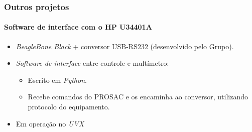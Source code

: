 \begin{frame}
\frametitle{Outros projetos}
\framesubtitle{Software de interface com o HP U34401A}

\begin{itemize}
  \item \textit{BeagleBone Black} + conversor USB-RS232 (desenvolvido pelo
  Grupo).
  \vspace{12pt}
  \item \textit{Software de interface} entre controle e multímetro:
  	\begin{itemize}
	\item Escrito em \textit{Python}.
	\item Recebe comandos do PROSAC e os encaminha ao conversor, utilizando
	protocolo do equipamento.
	\end{itemize}
	\vspace{12pt}
	\item Em operação no \textit{UVX}		    
\end{itemize}

\end{frame}